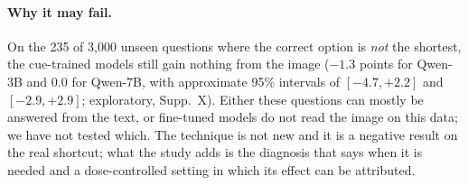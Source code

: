 \paragraph{Why it may fail.}
On the 235 of 3{,}000 unseen questions where the correct option is \emph{not} the shortest, the cue-trained models still gain nothing from the image ($-1.3$ points for Qwen-3B and $0.0$ for Qwen-7B, with approximate 95\% intervals of $[-4.7,+2.2]$ and $[-2.9,+2.9]$; exploratory, Supp.~X).
Either these questions can mostly be answered from the text, or fine-tuned models do not read the image on this data; we have not tested which.
The technique is not new and it is a negative result on the real shortcut; what the study adds is the diagnosis that says when it is needed and a dose-controlled setting in which its effect can be attributed.
